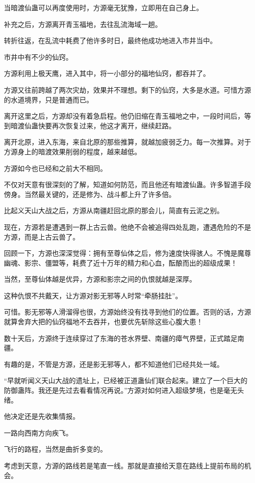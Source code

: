 \begin{this_body}
当暗渡仙蛊可以再度使用时，方源毫无犹豫，立即用在自己身上。

补充之后，方源离开青玉福地，去往乱流海域一趟。

转折往返，在乱流中耗费了他许多时日，最终他成功地进入市井当中。

市井中有不少的仙窍。

方源利用上极天鹰，进入其中，将一小部分的福地仙窍，都吞并了。

方源又往前跨越了两次灾劫，效果并不理想。剩下的仙窍，大多是水道。可惜方源的水道境界，只是普通而已。

离开这里之后，方源却没有着急启程。他仍旧缩在青玉福地之中，一段时间后，等到暗渡仙蛊快要再次恢复过来，他这才离开，继续赶路。

离开北原，进入东海，来自北原的那些推算，就越加疲弱乏力。每一次推算。对于方源身上的暗渡效果削弱的程度，越来越低。

方源如今也已经和之前大不相同。

不仅对天意有很深刻的了解，知道如何防范，而且他还有暗渡仙蛊。许多智道手段傍身。当然最关键的，还是修为、战斗都上升了许多倍。

比起义天山大战之后，方源从南疆赶回北原的那会儿，简直有云泥之别。

现在，方源若是遭遇到一群上古云兽。他绝不会被追得四处乱跑，遭遇危险的不是方源，而是上古云兽了。

回顾一下，方源也深深觉得：拥有至尊仙体之后，修为速度快得骇人。不愧是魔尊幽魂、影宗、僵盟等，耗费了近十万年的精力和心血，酝酿而出的超级成果！

当然，至尊仙体越是优异，方源和影宗之间的仇恨就越是深厚。

这种仇恨不共戴天，让方源对影无邪等人时常“牵肠挂肚”。

可惜。影无邪等人滑溜得也很，方源始终没有找寻到他们的位置。否则的话，方源就算舍弃大把的仙窍福地不去吞并，也要优先斩除这些心腹大患！

数十天后，方源终于连续穿过了东海的苍水界壁、南疆的瘴气界壁，正式踏足南疆。

有趣的是，不管是方源，还是影无邪等人，都不知道他们已经共处一域。

“早就听闻义天山大战的遗址上，已经被正道蛊仙们联合起来。建立了一个巨大的防御蛊阵。我还是先过去看看情况再说。”方源对如何进入超级梦境，也是毫无头绪。

他决定还是先收集情报。

一路向西南方向疾飞。

飞行的路程，当然是曲折多变的。

考虑到天意，方源的路线若是笔直一线。那就是直接给天意在路线上提前布局的机会。


\end{this_body}
